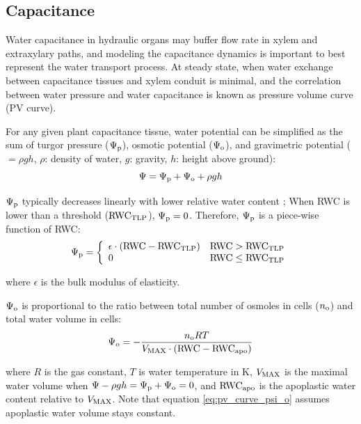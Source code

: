 \documentclass[twoside,10pt]{report}
\begin{document}
\subsection{Capacitance\label{section:capacitance}}
\par Water capacitance in hydraulic organs may buffer flow rate in xylem and extraxylary paths, and modeling the capacitance dynamics is important to best represent the water transport process. At steady state, when water exchange between capacitance tissues and xylem conduit is minimal, and the correlation between water pressure and water capacitance is known as pressure volume curve (PV curve).

\par For any given plant capacitance tissue, water potential can be simplified as the sum of turgor pressure ($\Psi_\text{p}$), osmotic potential ($\Psi_\text{o}$), and gravimetric potential ($= \rho gh$, $\rho$: density of water, $g$: gravity, $h$: height above ground):
\begin{equation}
    \Psi = \Psi_\text{p} + \Psi_\text{o} + \rho gh
    \label{eq:pv_curve_general}
\end{equation}

\par $\Psi_\text{p}$ typically decreases linearly with lower relative water content \citep[RWC;][]{tyree1972measurement, bartlett2012determinants}; When RWC is lower than a threshold ($\text{RWC}_\text{TLP}$), $\Psi_\text{p} = 0$. Therefore, $\Psi_\text{p}$ is a piece-wise function of RWC:
\begin{equation}
    \Psi_\text{p}= \left\{
            \begin{array}{lr} 
                \epsilon \cdot \left( \text{RWC} - \text{RWC}_\text{TLP} \right)    & \text{RWC} > \text{RWC}_\text{TLP} \\
                0                                               & \text{RWC} \leq \text{RWC}_\text{TLP}
            \end{array}
          \right.
\end{equation}
\par \noindent where $\epsilon$ is the bulk modulus of elasticity.

\par $\Psi_\text{o}$ is proportional to the ratio between total number of osmoles in cells ($n_\text{o}$) and total water volume in cells:
\begin{equation}
    \Psi_\text{o} = -\dfrac{n_\text{o} RT}{V_\text{MAX} \cdot \left( \text{RWC} - \text{RWC}_\text{apo} \right)}
    \label{eq:pv_curve_psi_o}
\end{equation}
\par \noindent where $R$ is the gas constant, $T$ is water temperature in K, $V_\text{MAX}$ is the maximal water volume when $\Psi - \rho gh = \Psi_\text{p} + \Psi_\text{o} = 0$, and $\text{RWC}_\text{apo}$ is the apoplastic water content relative to $V_\text{MAX}$. Note that equation \ref{eq:pv_curve_psi_o} assumes apoplastic water volume stays constant.
\end{document}

